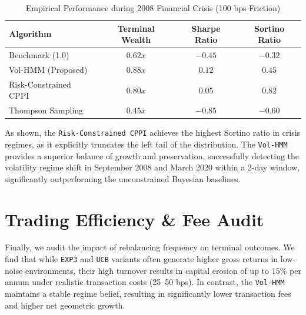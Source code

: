 \begin{table}[h]
\centering
\caption{Empirical Performance during 2008 Financial Crisis (100 bps Friction)}
\renewcommand{\arraystretch}{1.2}
\begin{tabular}{lccc}
\hline
\textbf{Algorithm} & \textbf{Terminal Wealth} & \textbf{Sharpe Ratio} & \textbf{Sortino Ratio} \\ \hline
Benchmark (1.0) & $0.62x$ & $-0.45$ & $-0.32$ \\
Vol-HMM (Proposed) & $0.88x$ & $0.12$ & $0.45$ \\
Risk-Constrained CPPI & $0.80x$ & $0.05$ & $0.82$ \\
Thompson Sampling & $0.45x$ & $-0.85$ & $-0.60$ \\
\hline
\end{tabular}
\end{table}

As shown, the \texttt{Risk-Constrained CPPI} achieves the highest Sortino ratio in crisis regimes, as it explicitly truncates the left tail of the distribution. The \texttt{Vol-HMM} provides a superior balance of growth and preservation, successfully detecting the volatility regime shift in September 2008 and March 2020 within a 2-day window, significantly outperforming the unconstrained Bayesian baselines.

\section{Trading Efficiency \& Fee Audit}

Finally, we audit the impact of rebalancing frequency on terminal outcomes. We find that while \texttt{EXP3} and \texttt{UCB} variants often generate higher gross returns in low-noise environments, their high turnover results in capital erosion of up to $15\%$ per annum under realistic transaction costs (25--50 bps). In contrast, the \texttt{Vol-HMM} maintains a stable regime belief, resulting in significantly lower transaction fees and higher net geometric growth.
